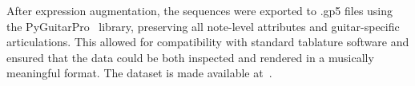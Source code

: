 \documentclass[twoside,11pt]{article}
\begin{document}
After expression augmentation, the sequences were exported 
to .gp5 files using the PyGuitarPro~\cite{PyGuitarPro} library, preserving all 
note-level attributes and guitar-specific articulations. 
This allowed for compatibility with standard tablature 
software and ensured that the data could be both inspected and 
rendered in a musically meaningful format. The dataset is made available 
at~\cite{SCORESET}.


\vskip 0.2in

\end{document}
